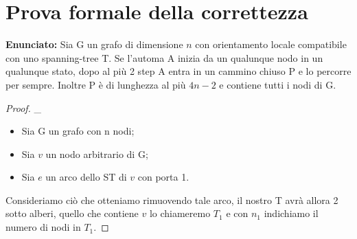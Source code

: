 \section{Prova formale della correttezza}
\textbf{Enunciato: } Sia G un grafo di dimensione $n$ con orientamento locale
compatibile con uno spanning-tree T. Se l'automa A inizia da un qualunque nodo
in un qualunque stato, dopo al più 2 step A entra in un cammino chiuso P e lo
percorre per sempre. Inoltre P è di lunghezza al più $4n-2$ e contiene tutti i
nodi di G.
\begin{proof}
    \_
    \begin{itemize}
        \item Sia G un grafo con n nodi;
        \item Sia $v$ un nodo arbitrario di G;
        \item Sia $e$ un arco dello ST di $v$ con porta 1.
    \end{itemize}
    Consideriamo ciò che otteniamo rimuovendo tale arco, il nostro T avrà allora 2
    sotto alberi, quello che contiene $v$ lo chiameremo $T_1$ e con $n_1$
    indichiamo il numero di nodi in $T_1$.


\end{proof}
